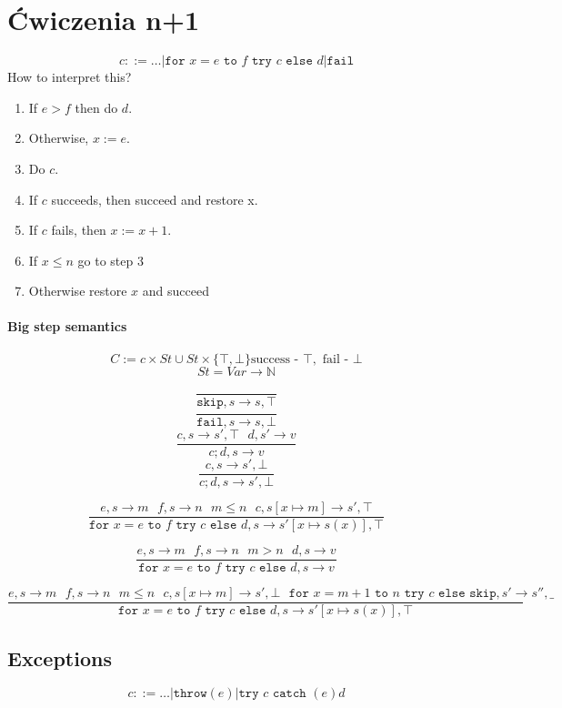 \documentclass{article}
\begin{document}
\section{Ćwiczenia n+1}
$$c::=\dots|\texttt{for }x=e\texttt{ to } f\texttt{ try } c\texttt{ else } d|\texttt{fail}$$
How to interpret this?
\begin{enumerate}
	\item If $ e>f $ then do $ d $.
	\item Otherwise, $ x:=e $.
	\item Do $ c $.
	\item If $ c $ succeeds, then succeed and restore x.
	\item If $ c $ fails, then $ x:=x+1 $.
	\item If $ x\le n  $ go to step 3
	\item Otherwise restore $ x $ and succeed
\end{enumerate}
\paragraph{Big step semantics}
$$C:=c\times St\cup St\times\{\top, \bot\}\text{success - }\top,\text{ fail - }\bot$$
$$St=Var\rightarrow\mathbb{N}$$

$$\frac{}{\texttt{skip}, s\rightarrow s,\top}$$
$$\frac{}{\texttt{fail}, s\rightarrow s, \bot}$$
$$\frac{
	c,s\rightarrow s',\top\ \ \ 
	d,s'\rightarrow v
}{
	c;d, s\rightarrow v
}$$
$$\frac{c,s\rightarrow s',\bot}{
	c;d, s\rightarrow s',\bot
}$$

$$\frac{
	e,s\rightarrow m\ \ \ 
	f,s\rightarrow n\ \ \
	m\le n\ \ \ 
	c,s[x\mapsto m]\rightarrow s',\top
}{
	\texttt{for }x=e\texttt{ to }f\texttt{ try }
	c\texttt{ else }d, s\rightarrow s'[x\mapsto s(x)],\top
}$$

$$\frac{
	e,s\rightarrow m\ \ \ 
	f,s\rightarrow n\ \ \
	m > n\ \ \ 
	d,s\rightarrow v
}{
	\texttt{for }x=e\texttt{ to }f\texttt{ try }
	c\texttt{ else }d, s\rightarrow v
}$$

$$\frac{
	e,s\rightarrow m\ \ \ 
	f,s\rightarrow n\ \ \
	m\le n\ \ \ 
	c,s[x\mapsto m]\rightarrow s',\bot\ \ \ 
	\texttt{for }x=m+1\texttt{ to }n\texttt{ try }
	c\texttt{ else skip}, s'\rightarrow s'', \_
}{
	\texttt{for }x=e\texttt{ to }f\texttt{ try }
	c\texttt{ else }d, s\rightarrow s'[x\mapsto s(x)],\top
}$$


\subsection{Exceptions}
$$c::=\dots|\texttt{throw}(e)|\texttt{try } c \texttt{ catch }(e)d$$
\end{document}

